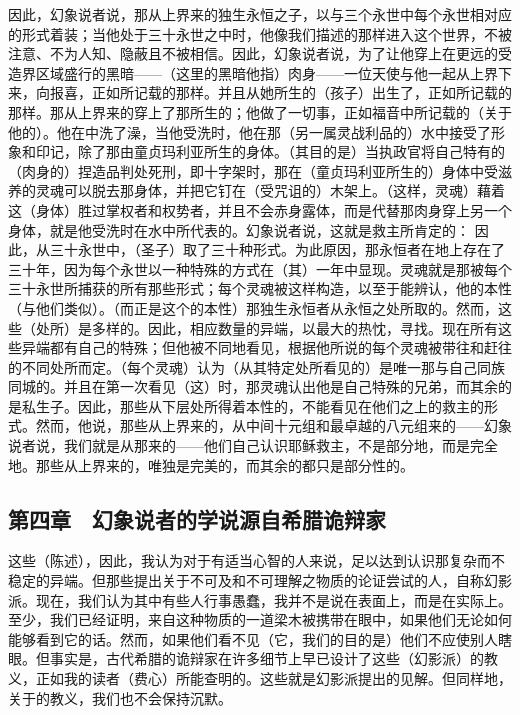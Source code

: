 因此，幻象说者说，那从上界来的独生永恒之子，以与三个永世中每个永世相对应的形式着装；当他处于三十永世之中时，他像我们描述的那样进入这个世界，不被注意、不为人知、隐蔽且不被相信。因此，幻象说者说，为了让他穿上在更远的受造界区域盛行的黑暗——（这里的黑暗他指）肉身——一位天使与他一起从上界下来，向报喜，正如所记载的那样。并且从她所生的（孩子）出生了，正如所记载的那样。那从上界来的穿上了那所生的；他做了一切事，正如福音中所记载的（关于他的）。他在中洗了澡，当他受洗时，他在那（另一属灵战利品的）水中接受了形象和印记，除了那由童贞玛利亚所生的身体。（其目的是）当执政官将自己特有的（肉身的）捏造品判处死刑，即十字架时，那在（童贞玛利亚所生的）身体中受滋养的灵魂可以脱去那身体，并把它钉在（受咒诅的）木架上。（这样，灵魂）藉着这（身体）胜过掌权者和权势者，并且不会赤身露体，而是代替那肉身穿上另一个身体，就是他受洗时在水中所代表的。幻象说者说，这就是救主所肯定的：  因此，从三十永世中，（圣子）取了三十种形式。为此原因，那永恒者在地上存在了三十年，因为每个永世以一种特殊的方式在（其）一年中显现。灵魂就是那被每个三十永世所捕获的所有那些形式；每个灵魂被这样构造，以至于能辨认，他的本性（与他们类似）。（而正是这个的本性）那独生永恒者从永恒之处所取的。然而，这些（处所）是多样的。因此，相应数量的异端，以最大的热忱，寻找。现在所有这些异端都有自己的特殊；但他被不同地看见，根据他所说的每个灵魂被带往和赶往的不同处所而定。（每个灵魂）认为（从其特定处所看见的）是唯一那与自己同族同城的。并且在第一次看见（这）时，那灵魂认出他是自己特殊的兄弟，而其余的是私生子。因此，那些从下层处所得着本性的，不能看见在他们之上的救主的形式。然而，他说，那些从上界来的，从中间十元组和最卓越的八元组来的——幻象说者说，我们就是从那来的——他们自己认识耶稣救主，不是部分地，而是完全地。那些从上界来的，唯独是完美的，而其余的都只是部分性的。\par


\subsection{第四章　幻象说者的学说源自希腊诡辩家}

这些（陈述），因此，我认为对于有适当心智的人来说，足以达到认识那复杂而不稳定的异端。但那些提出关于不可及和不可理解之物质的论证尝试的人，自称幻影派。现在，我们认为其中有些人行事愚蠢，我并不是说在表面上，而是在实际上。至少，我们已经证明，来自这种物质的一道梁木被携带在眼中，如果他们无论如何能够看到它的话。然而，如果他们看不见（它，我们的目的是）他们不应使别人瞎眼。但事实是，古代希腊的诡辩家在许多细节上早已设计了这些（幻影派）的教义，正如我的读者（费心）所能查明的。这些就是幻影派提出的见解。但同样地，关于的教义，我们也不会保持沉默。\par

